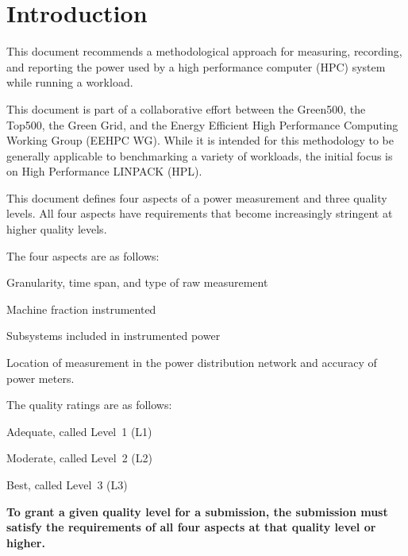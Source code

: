 \chapter{Introduction}
\label{sec:intro}

\noindent
This document recommends a methodological approach for measuring, recording, and reporting the power used by a high performance computer (HPC) system while running a workload.
\wl

\noindent
This document is part of a collaborative effort between the Green500, the Top500, the Green Grid, and the Energy Efficient High Performance Computing Working Group (EEHPC WG).
While it is intended for this methodology to be generally applicable to benchmarking a variety of workloads, the initial focus is on High Performance LINPACK (HPL).
\wl

\noindent
This document defines four aspects of a power measurement and three quality levels.
All four aspects have requirements that become increasingly stringent at higher quality levels. 
\wl

\noindent
The four aspects are as follows:

\begin{packed_enum}
\item 
Granularity, time span, and type of raw measurement
\item 
Machine fraction instrumented
\item 
Subsystems included in instrumented power
\item 
Location of measurement in the power distribution network and accuracy of power meters.
\end{packed_enum}

\noindent
The quality ratings are as follows:

\begin{packed_item}
\item 
Adequate, called Level~1 (L1)
\item
Moderate, called Level~2 (L2)
\item
Best, called Level~3 (L3)
\end{packed_item}

\noindent
\textbf{To grant a given quality level for a submission, the submission must
satisfy the requirements of all four aspects at that quality level
or higher.}

\noindent
